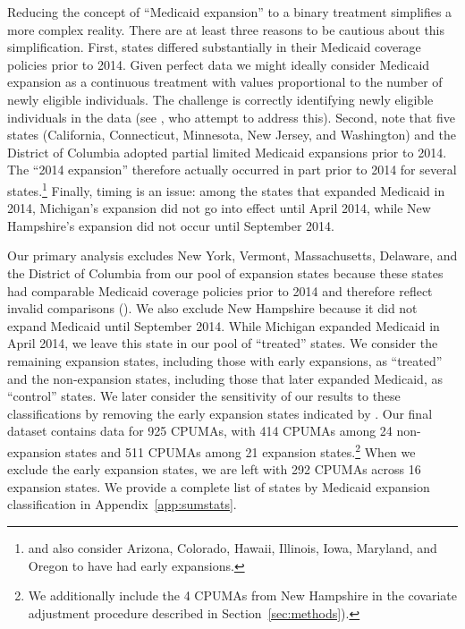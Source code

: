 \documentclass[aoas]{imsart}
\theoremstyle{plain}
\theoremstyle{remark}
\begin{document}
Reducing the concept of ``Medicaid expansion'' to a binary treatment simplifies a more complex reality. There are at least three reasons to be cautious about this simplification. First, states differed substantially in their Medicaid coverage policies prior to 2014. Given perfect data we might ideally consider Medicaid expansion as a continuous treatment with values proportional to the number of newly eligible individuals. The challenge is correctly identifying newly eligible individuals in the data (see \cite{frean2017premium}, who attempt to address this). Second, \cite{frean2017premium} note that five states (California, Connecticut, Minnesota, New Jersey, and Washington) and the District of Columbia adopted partial limited Medicaid expansions prior to 2014. The ``2014 expansion'' therefore actually occurred in part prior to 2014 for several states.\footnote{\cite{kaestner2017effects} and \cite{courtemanche2017early} also consider Arizona, Colorado, Hawaii, Illinois, Iowa, Maryland, and Oregon to have had early expansions.} Finally, timing is an issue: among the states that expanded Medicaid in 2014, Michigan's expansion did not go into effect until April 2014, while New Hampshire's expansion did not occur until September 2014.

Our primary analysis excludes New York, Vermont, Massachusetts, Delaware, and the District of Columbia from our pool of expansion states because these states had comparable Medicaid coverage policies prior to 2014 and therefore reflect invalid comparisons (\cite{kaestner2017effects}). We also exclude New Hampshire because it did not expand Medicaid until September 2014. While Michigan expanded Medicaid in April 2014, we leave this state in our pool of ``treated'' states. We consider the remaining expansion states, including those with early expansions, as ``treated'' and the non-expansion states, including those that later expanded Medicaid, as ``control'' states. We later consider the sensitivity of our results to these classifications by removing the early expansion states indicated by \cite{frean2017premium}. Our final dataset contains data for 925 CPUMAs, with 414 CPUMAs among 24 non-expansion states and 511 CPUMAs among 21 expansion states.\footnote{We additionally include the 4 CPUMAs from New Hampshire in the covariate adjustment procedure described in Section~\ref{sec:methods}).} When we exclude the early expansion states, we are left with 292 CPUMAs across 16 expansion states. We provide a complete list of states by Medicaid expansion classification in Appendix~\ref{app:sumstats}.
\end{document}
